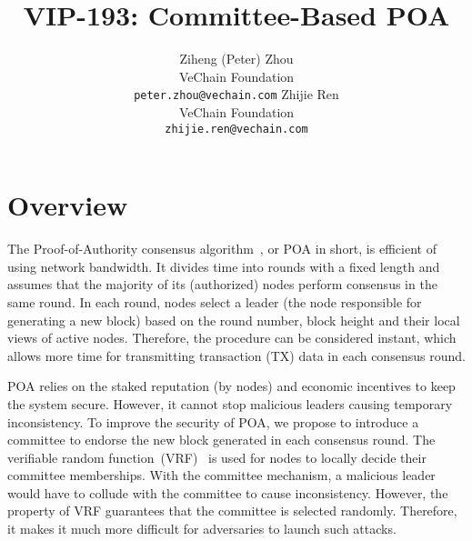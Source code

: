 \documentclass{article}
\title{VIP-193: Committee-Based POA}
\author{
  Ziheng (Peter) Zhou \vspace{1ex}\\
  VeChain Foundation \\
  \texttt{peter.zhou@vechain.com}
  \And
  Zhijie Ren \vspace{1ex} \\
  VeChain Foundation \\
  \texttt{zhijie.ren@vechain.com}
}
\date{\vspace{-5ex}}
\begin{document}
\maketitle




\section{Overview}
The Proof-of-Authority consensus algorithm~\cite{VWP18}, or POA in short, is efficient of using network bandwidth. It divides time into rounds with a fixed length and assumes that the majority of its (authorized) nodes perform consensus in the same round. In each round, nodes select a leader (the node responsible for generating a new block) based on the round number, block height and their local views of active nodes. Therefore, the procedure can be considered instant, which allows more time for transmitting transaction (TX) data in each consensus round.

POA relies on the staked reputation (by nodes) and economic incentives to keep the system secure. However, it cannot stop malicious leaders causing temporary inconsistency. To improve the security of POA, we propose to introduce a committee to endorse the new block generated in each consensus round. The verifiable random function~(VRF)~\cite{PapEtAl99} is used for nodes to locally decide their committee memberships. With the committee mechanism, a malicious leader would have to collude with the committee to cause inconsistency. However, the property of VRF guarantees that the committee is selected randomly. Therefore, it makes it much more difficult for adversaries to launch such attacks.
\end{document}
